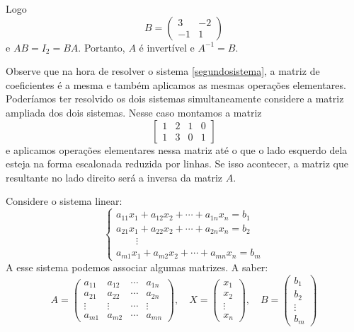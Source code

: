 Logo
\[
    B = \begin{pmatrix}
        3 & -2\\
        -1 & 1
    \end{pmatrix}
\]
e $AB = I_2 = BA$. Portanto, $A$ é invertível e $A^{-1} = B$.

Observe que na hora de resolver o sistema \eqref{segundosistema}, a matriz de coeficientes é a mesma e também  aplicamos as mesmas operações elementares. Poderíamos ter resolvido os dois sistemas simultaneamente considere a matriz ampliada dos dois sistemas. Nesse caso montamos a matriz
\[
    \left[\begin{array}{cc|cc}
        1 & 2 & 1 & 0\\
        1 & 3 & 0 & 1
    \end{array}\right]
\]
e aplicamos operações elementares nessa matriz até o que o lado esquerdo dela esteja na forma escalonada reduzida por linhas. Se isso acontecer, a matriz que resultante no lado direito será a inversa da matriz $A$.

Considere o sistema linear: 
\begin{equation}
\begin{cases}
        a_{11}x_1 + a_{12}x_2 + \cdots + a_{1n}x_n = b_1\\
        a_{21}x_1 + a_{22}x_2 + \cdots + a_{2n}x_n = b_2\\
        \qquad \vdots\\
        a_{m1}x_1 + a_{m2}x_2 + \cdots + a_{mn}x_n = b_m
    \end{cases}
\end{equation}
A esse sistema podemos associar algumas matrizes. A saber:
\[
    A = \begin{pmatrix}
        a_{11} & a_{12} & \cdots & a_{1n}\\
        a_{21} & a_{22} & \cdots & a_{2n}\\
        \vdots & \vdots & \cdots & \vdots\\
        a_{m1} & a_{m2} & \cdots & a_{mn}
    \end{pmatrix}, \quad
    X = \begin{pmatrix}
        x_1\\
        x_2\\
        \vdots\\
        x_n
    \end{pmatrix},\quad 
    B = \begin{pmatrix}
        b_1\\
        b_2\\
        \vdots\\
        b_m
    \end{pmatrix}
\]

